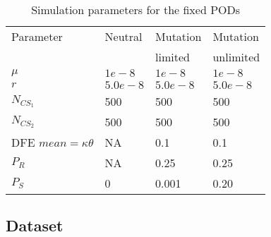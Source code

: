 \documentclass[12pt]{article}
\begin{document}
\begin{table}[ht]
 \caption{Simulation parameters for the fixed PODs}
 \label{table:table2}
  \centering
  \begin{tabular}{llll}
   \cmidrule(r){1-4}
    Parameter                 & Neutral  & Mutation & Mutation    \\
                              &          & limited  & unlimited \\
    \midrule
    $\mu$                     & $1e-8$   & $1e-8$   & $1e-8$      \\
    $r$                       & $5.0e-8$ & $5.0e-8$ & $5.0e-8$    \\
    $N_{CS_{1}}$              & 500      & 500      & 500         \\
    $N_{CS_{2}}$              & 500      & 500      & 500         \\
    DFE $mean=\kappa\theta$   & NA       & 0.1      & 0.1         \\
    $P_{R}$                   & NA       & 0.25     & 0.25        \\
    $P_{S}$                    & 0        & 0.001    & 0.20        \\
    \bottomrule
  \end{tabular}
  \label{tab:tab2}
\end{table}

\subsection*{Dataset}
\end{document}
